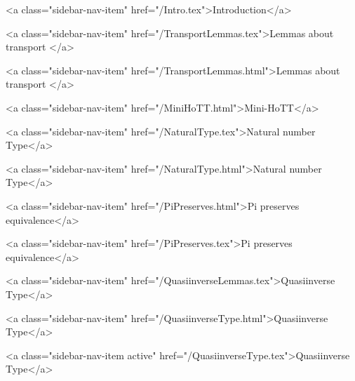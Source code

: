       
    
      
        
          <a class="sidebar-nav-item" href="/Intro.tex">Introduction</a>
        
      
    
      
        
          <a class="sidebar-nav-item" href="/TransportLemmas.tex">Lemmas about transport </a>
        
      
    
      
        
          <a class="sidebar-nav-item" href="/TransportLemmas.html">Lemmas about transport </a>
        
      
    
      
        
          <a class="sidebar-nav-item" href="/MiniHoTT.html">Mini-HoTT</a>
        
      
    
      
        
          <a class="sidebar-nav-item" href="/NaturalType.tex">Natural number Type</a>
        
      
    
      
        
          <a class="sidebar-nav-item" href="/NaturalType.html">Natural number Type</a>
        
      
    
      
        
          <a class="sidebar-nav-item" href="/PiPreserves.html">Pi preserves equivalence</a>
        
      
    
      
        
          <a class="sidebar-nav-item" href="/PiPreserves.tex">Pi preserves equivalence</a>
        
      
    
      
        
          <a class="sidebar-nav-item" href="/QuasiinverseLemmas.tex">Quasiinverse Type</a>
        
      
    
      
        
          <a class="sidebar-nav-item" href="/QuasiinverseType.html">Quasiinverse Type</a>
        
      
    
      
        
          <a class="sidebar-nav-item active" href="/QuasiinverseType.tex">Quasiinverse Type</a>
        
